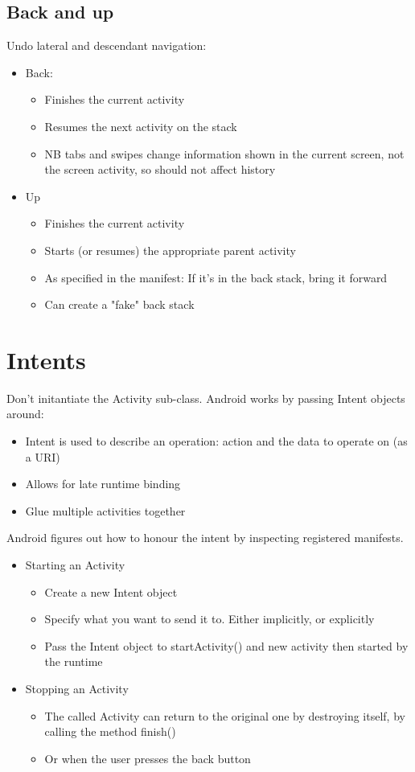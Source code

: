 \documentclass{article}
\begin{document}
\subsection{Back and up}

Undo lateral and descendant navigation:
\begin{itemize}
  \item Back:
  \begin{itemize}
    \item Finishes the current activity
    \item Resumes the next activity on the stack
    \item NB tabs and swipes change information shown in the current screen, not the screen activity, so should not affect history
  \end{itemize}
  \item Up
  \begin{itemize}
    \item Finishes the current activity
    \item Starts (or resumes) the appropriate parent activity
    \item As specified in the manifest: If it’s in the back stack, bring it forward
    \item Can create a "fake" back stack
  \end{itemize}
\end{itemize}

\section{Intents}

Don’t initantiate the Activity sub-class. Android works by passing Intent objects around:
\begin{itemize}
  \item Intent is used to describe an operation: action and the data to operate on (as a URI)
  \item Allows for late runtime binding
  \item Glue multiple activities together
\end{itemize}
Android figures out how to honour the intent by inspecting registered manifests.
\begin{itemize}
  \item Starting an Activity
  \begin{itemize}
    \item Create a new Intent object
    \item Specify what you want to send it to. Either implicitly, or explicitly
    \item Pass the Intent object to startActivity() and new activity then started by the runtime 
  \end{itemize}
  \item Stopping an Activity
  \begin{itemize}
    \item The called Activity can return to the original one by destroying itself, by calling the method finish()
    \item Or when the user presses the back button
  \end{itemize}
\end{itemize}
\end{document}
